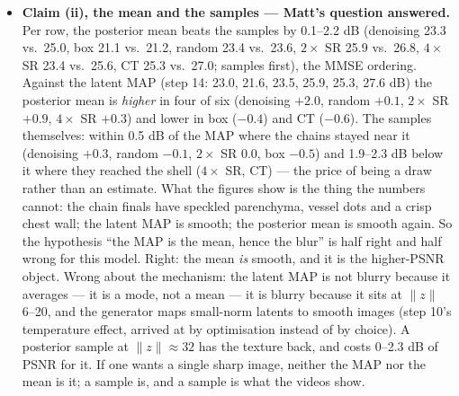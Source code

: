 \documentclass[11pt]{article}
\begin{document}
\begin{itemize}
        vs.\ 10, $2\times$ SR $-246$ to $-191$ vs.\ $-33$), and the box
        and random chains moved only 5--9 from their start. The traces
        say the same in two ways: $\|z\|$ of denoising and $2\times$ SR is
        still rising with no plateau at iteration 160, and box and random
        are flat at a value that is not the shell --- the chain is
        trapped by the step size, not converged. Those four are the
        \texttt{\_stiff} run's business. The residuals do move in the
        claimed direction everywhere (0.56--0.86 at the MAP to 0.78--0.96
        at the end), which is the noise-fitting of the latent MAP being
        undone.
  \item \textbf{Claim (ii), the mean and the samples --- Matt's question
        answered.} Per row, the posterior mean beats the samples by
        0.1--2.2 dB (denoising 23.3 vs.\ 25.0, box 21.1 vs.\ 21.2, random
        23.4 vs.\ 23.6, $2\times$ SR 25.9 vs.\ 26.8, $4\times$ SR 23.4 vs.\
        25.6, CT 25.3 vs.\ 27.0; samples first), the MMSE ordering. Against
        the latent MAP (step 14: 23.0, 21.6, 23.5, 25.9, 25.3, 27.6 dB) the
        posterior mean is \emph{higher} in four of six (denoising $+2.0$,
        random $+0.1$, $2\times$ SR $+0.9$, $4\times$ SR $+0.3$) and lower
        in box ($-0.4$) and CT ($-0.6$). The samples themselves: within
        0.5 dB of the MAP where the chains stayed near it (denoising
        $+0.3$, random $-0.1$, $2\times$ SR $0.0$, box $-0.5$) and 1.9--2.3
        dB below it where they reached the shell ($4\times$ SR, CT) ---
        the price of being a draw rather than an estimate. What the
        figures show is the thing the numbers cannot: the chain finals
        have speckled parenchyma, vessel dots and a crisp chest wall; the
        latent MAP is smooth; the posterior mean is smooth again. So the
        hypothesis ``the MAP is the mean, hence the blur'' is half right
        and half wrong for this model. Right: the mean \emph{is} smooth,
        and it is the higher-PSNR object. Wrong about the mechanism: the
        latent MAP is not blurry because it averages --- it is a mode, not
        a mean --- it is blurry because it sits at $\|z\|$ 6--20, and the
        generator maps small-norm latents to smooth images (step 10's
        temperature effect, arrived at by optimisation instead of by
        choice). A posterior sample at $\|z\| \approx 32$ has the texture
        back, and costs 0--2.3 dB of PSNR for it. If one wants a single
        sharp image, neither the MAP nor the mean is it; a sample is, and
        a sample is what the videos show.

\end{itemize}
\end{document}
